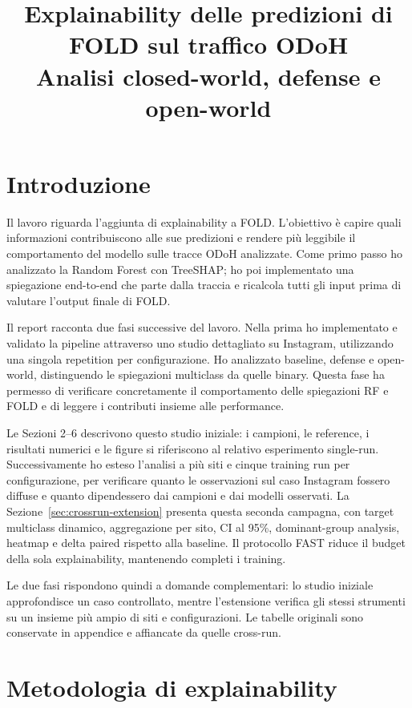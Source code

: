 \documentclass[11pt,a4paper]{article}
\title{Explainability delle predizioni di FOLD sul traffico ODoH\\
\large Analisi closed-world, defense e open-world}
\author{}
\date{}
\begin{document}
\maketitle

\section{Introduzione}
Il lavoro riguarda l'aggiunta di explainability a FOLD. L'obiettivo è capire quali informazioni contribuiscono alle sue predizioni e rendere più leggibile il comportamento del modello sulle tracce ODoH analizzate. Come primo passo ho analizzato la Random Forest con TreeSHAP; ho poi implementato una spiegazione end-to-end che parte dalla traccia e ricalcola tutti gli input prima di valutare l'output finale di FOLD.

Il report racconta due fasi successive del lavoro. Nella prima ho implementato e validato la pipeline attraverso uno studio dettagliato su Instagram, utilizzando una singola repetition per configurazione. Ho analizzato baseline, defense e open-world, distinguendo le spiegazioni multiclass da quelle binary. Questa fase ha permesso di verificare concretamente il comportamento delle spiegazioni RF e FOLD e di leggere i contributi insieme alle performance.

Le Sezioni 2--6 descrivono questo studio iniziale: i campioni, le reference, i risultati numerici e le figure si riferiscono al relativo esperimento single-run. Successivamente ho esteso l'analisi a più siti e cinque training run per configurazione, per verificare quanto le osservazioni sul caso Instagram fossero diffuse e quanto dipendessero dai campioni e dai modelli osservati. La Sezione~\ref{sec:crossrun-extension} presenta questa seconda campagna, con target multiclass dinamico, aggregazione per sito, CI al 95\%, dominant-group analysis, heatmap e delta paired rispetto alla baseline. Il protocollo FAST riduce il budget della sola explainability, mantenendo completi i training.

Le due fasi rispondono quindi a domande complementari: lo studio iniziale approfondisce un caso controllato, mentre l'estensione verifica gli stessi strumenti su un insieme più ampio di siti e configurazioni. Le tabelle originali sono conservate in appendice e affiancate da quelle cross-run.

\section{Metodologia di explainability}
\end{document}

